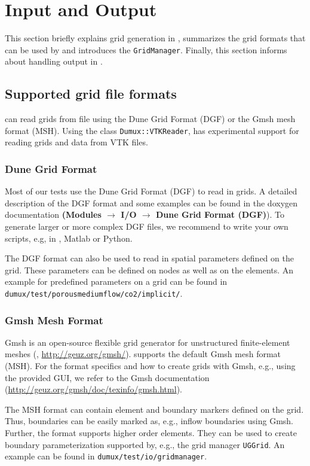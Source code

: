 \section{Input and Output}
\label{sec:inputandoutput}

This section briefly explains grid generation in \Dumux, summarizes
the grid formats that can be used by \Dumux and introduces the \Dumux \texttt{GridManager}.
Finally, this section informs about handling output in \Dumux.

\subsection{Supported grid file formats}
\Dumux can read grids from file using the Dune Grid Format (DGF) or the Gmsh mesh format (MSH).
Using the class \texttt{Dumux::VTKReader}, \Dumux has experimental support for reading grids and data from VTK files.

\subsubsection{Dune Grid Format}
Most of our \Dumux tests use the Dune Grid Format (DGF) to read in grids. A detailed description
of the DGF format and some examples can be found in the \Dune doxygen documentation
\textbf{(Modules $\rightarrow$ I/O $\rightarrow$ Dune Grid Format (DGF)}). To generate larger or more
complex DGF files, we recommend to write your own scripts, e.g, in \Cplusplus, Matlab or Python.

The DGF format can also be used to read in spatial parameters defined on the grid. These parameters can
be defined on nodes as well as on the elements. An example for predefined parameters on a grid
can be found in \texttt{dumux/test/porousmediumflow/co2/implicit/}.

\subsubsection{Gmsh Mesh Format}
Gmsh is an open-source flexible grid generator for unstructured finite-element meshes (\cite{GEUZAINE2009}, \url{http://geuz.org/gmsh/}).
\Dumux supports the default Gmsh mesh format (MSH). For the format specifics and how to create grids with Gmsh, e.g., using
the provided GUI, we refer to the Gmsh documentation (\url{http://geuz.org/gmsh/doc/texinfo/gmsh.html}).

The MSH format can contain element and boundary markers defined on the grid. Thus, boundaries can be easily marked as, e.g., inflow boundaries
using Gmsh. Further, the format supports higher order elements. They can be used to create boundary parameterization supported by, e.g., the grid
manager \texttt{UGGrid}.
An example can be found in \texttt{dumux/test\allowbreak/io/gridmanager}.

